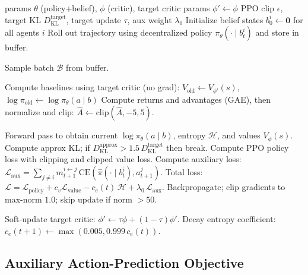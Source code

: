 \documentclass{article}
\theoremstyle{plain}
\theoremstyle{definition}
\theoremstyle{remark}
\begin{document}
\begin{algorithm}[tb]
   \caption{VABL with Stability Mechanisms (PPO)}
   \label{alg:vabl}
\begin{algorithmic}
    params $\theta$ (policy+belief), $\phi$ (critic), target critic params $\phi' \leftarrow \phi$
    PPO clip $\epsilon$, target KL $D_{\mathrm{KL}}^{\mathrm{target}}$, target update $\tau$, aux weight $\lambda_0$
   \STATE Initialize belief states $b_0^i \leftarrow \mathbf{0}$ for all agents $i$
       \STATE Roll out trajectory using decentralized policy $\pi_\theta(\cdot\mid b_t^i)$ and store in buffer.

       \STATE Sample batch $\mathcal{B}$ from buffer.

       \STATE Compute baselines using target critic (no grad):
       \STATE \hspace{1em}$V_{\mathrm{old}} \leftarrow V_{\phi'}(s)$, $\log \pi_{\mathrm{old}} \leftarrow \log \pi_\theta(a\mid b)$
       \STATE Compute returns and advantages (GAE), then normalize and clip: $\hat{A} \leftarrow \mathrm{clip}(\hat{A}, -5, 5)$.

           \STATE Forward pass to obtain current $\log \pi_\theta(a\mid b)$, entropy $\mathcal{H}$, and values $V_\phi(s)$.
           \STATE Compute approx KL; if $D_{\mathrm{KL}}^{\mathrm{approx}} > 1.5\, D_{\mathrm{KL}}^{\mathrm{target}}$ then break.
           \STATE Compute PPO policy loss with clipping and clipped value loss.
           \STATE Compute auxiliary loss:
           \STATE \hspace{1em}$\mathcal{L}_{\mathrm{aux}} = \sum_{j\neq i} m_{t+1}^{i\leftarrow j}\,\mathrm{CE}(\hat{\pi}(\cdot\mid b_t^i), a_{t+1}^j)$.
           \STATE Total loss: $\mathcal{L} = \mathcal{L}_{\mathrm{policy}} + c_v\mathcal{L}_{\mathrm{value}} - c_e(t)\,\mathcal{H} + \lambda_0\,\mathcal{L}_{\mathrm{aux}}$.
           \STATE Backpropagate; clip gradients to max-norm $1.0$; skip update if norm $>50$.
       \ENDFOR

       \STATE Soft-update target critic: $\phi' \leftarrow \tau \phi + (1-\tau)\phi'$.
       \STATE Decay entropy coefficient: $c_e(t{+}1) \leftarrow \max(0.005, 0.999\,c_e(t))$.
   \ENDFOR
\end{algorithmic}
\end{algorithm}

\subsection{Auxiliary Action-Prediction Objective}
\end{document}
